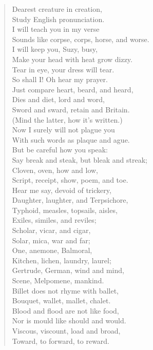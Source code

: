 \documentclass[11pt, oneside]{article}   	%
\begin{document}
\begin{verse}
Dearest creature in creation, \\
Study English pronunciation. \\
I will teach you in my verse \\
Sounds like corpse, corps, horse, and worse. \\
I will keep you, Suzy, busy, \\
Make your head with heat grow dizzy. \\
Tear in eye, your dress will tear. \\
So shall I! Oh hear my prayer. \\
Just compare heart, beard, and heard, \\
Dies and diet, lord and word, \\
Sword and sward, retain and Britain. \\
(Mind the latter, how it's written.) \\
Now I surely will not plague you \\
With such words as plaque and ague. \\
But be careful how you speak: \\
Say break and steak, but bleak and streak; \\
Cloven, oven, how and low, \\
Script, receipt, show, poem, and toe.\\
Hear me say, devoid of trickery, \\
Daughter, laughter, and Terpsichore, \\
Typhoid, measles, topsails, aisles, \\
Exiles, similes, and reviles; \\
Scholar, vicar, and cigar, \\
Solar, mica, war and far; \\
One, anemone, Balmoral, \\
Kitchen, lichen, laundry, laurel; \\
Gertrude, German, wind and mind, \\
Scene, Melpomene, mankind.\\
Billet does not rhyme with ballet, \\
Bouquet, wallet, mallet, chalet. \\
Blood and flood are not like food, \\
Nor is mould like should and would. \\
Viscous, viscount, load and broad, \\
Toward, to forward, to reward. \\

\end{verse}
\end{document}
